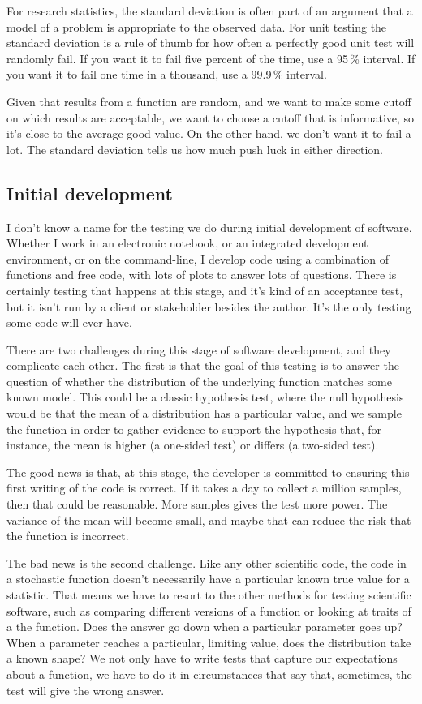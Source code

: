 \documentclass[fleqn,10pt]{olplainarticle}
\begin{document}
For research statistics, the standard deviation is often part
of an argument that a model of a problem is appropriate to
the observed data. For unit testing the standard deviation
is a rule of thumb for how often a perfectly good unit test
will randomly fail. If you want it to fail five percent of
the time, use a 95\,\% interval. If you want it to fail
one time in a thousand, use a 99.9\,\% interval.

Given that results from a function are random, and we
want to make some cutoff on which results are acceptable,
we want to choose a cutoff that is informative, so it's
close to the average good value. On the other hand, we don't
want it to fail a lot. The standard deviation tells us
how much push luck in either direction.


\subsection{Initial development}

I don't know a name for the testing we do during initial development
of software. Whether I work in an electronic notebook, or an integrated
development environment, or on the command-line, I develop code using
a combination of functions and free code, with lots of plots to answer
lots of questions. There is certainly testing that happens at this stage,
and it's kind of an acceptance test, but it isn't run by a client or
stakeholder besides the author. It's the only testing some code will ever have.

There are two challenges during this stage of software development,
and they complicate each other. The first is that the goal of this testing
is to answer the question of whether the distribution of the underlying
function matches some known model. This could be a classic hypothesis test,
where the null hypothesis would be that the mean of a distribution has a
particular value, and we sample the function in order to gather evidence
to support the hypothesis that, for instance, the mean is higher (a one-sided test) or
differs (a two-sided test).

The good news is that, at this stage, the developer is committed to
ensuring this first writing of the code is correct. If it takes a day
to collect a million samples, then that could be reasonable. More samples
gives the test more power. The variance of the mean will become small,
and maybe that can reduce the risk that the function is incorrect.

The bad news is the second challenge. Like any other scientific code,
the code in a stochastic function doesn't necessarily have a particular
known true value for a statistic. That means we have to resort to the
other methods for testing scientific software, such as comparing
different versions of a function or looking at traits of a the function.
Does the answer go down when a particular parameter goes up? When a parameter
reaches a particular, limiting value, does the distribution take a known
shape? We not only have to write tests that capture our expectations
about a function, we have to do it in circumstances that say that, sometimes,
the test will give the wrong answer.
\end{document}
